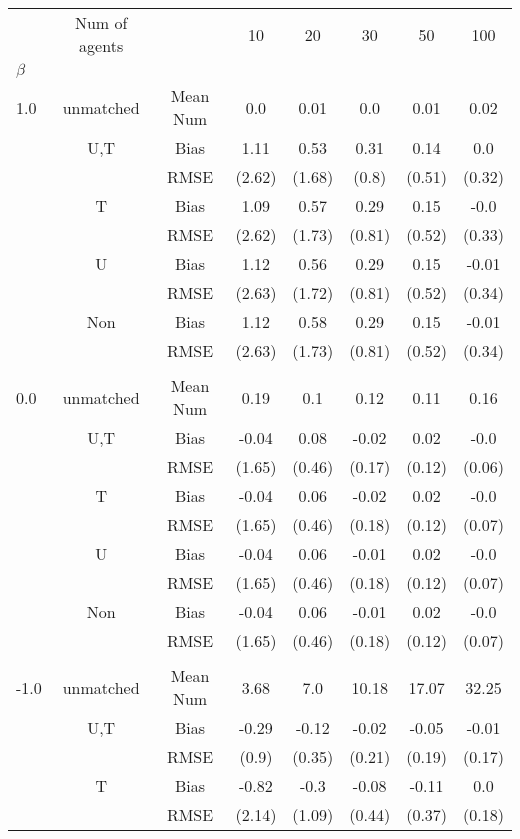 \begin{tabular}{@{\extracolsep{5pt}}lc|cccccc}
\toprule 
 & Num of agents &  & 10 & 20 & 30 & 50 & 100 \\
$\beta$ &  &  &  &  &  &  &  \\
\midrule 
1.0 & unmatched & Mean Num & 0.0 & 0.01 & 0.0 & 0.01 & 0.02 \\
 & U,T & Bias & 1.11 & 0.53 & 0.31 & 0.14 & 0.0 \\
 &  & RMSE & (2.62) & (1.68) & (0.8) & (0.51) & (0.32) \\
 & T & Bias & 1.09 & 0.57 & 0.29 & 0.15 & -0.0 \\
 &  & RMSE & (2.62) & (1.73) & (0.81) & (0.52) & (0.33) \\
 & U & Bias & 1.12 & 0.56 & 0.29 & 0.15 & -0.01 \\
 &  & RMSE & (2.63) & (1.72) & (0.81) & (0.52) & (0.34) \\
 & Non & Bias & 1.12 & 0.58 & 0.29 & 0.15 & -0.01 \\
 &  & RMSE & (2.63) & (1.73) & (0.81) & (0.52) & (0.34) \\
 &  &  &  &  &  &  &  \\
0.0 & unmatched & Mean Num & 0.19 & 0.1 & 0.12 & 0.11 & 0.16 \\
 & U,T & Bias & -0.04 & 0.08 & -0.02 & 0.02 & -0.0 \\
 &  & RMSE & (1.65) & (0.46) & (0.17) & (0.12) & (0.06) \\
 & T & Bias & -0.04 & 0.06 & -0.02 & 0.02 & -0.0 \\
 &  & RMSE & (1.65) & (0.46) & (0.18) & (0.12) & (0.07) \\
 & U & Bias & -0.04 & 0.06 & -0.01 & 0.02 & -0.0 \\
 &  & RMSE & (1.65) & (0.46) & (0.18) & (0.12) & (0.07) \\
 & Non & Bias & -0.04 & 0.06 & -0.01 & 0.02 & -0.0 \\
 &  & RMSE & (1.65) & (0.46) & (0.18) & (0.12) & (0.07) \\
 &  &  &  &  &  &  &  \\
-1.0 & unmatched & Mean Num & 3.68 & 7.0 & 10.18 & 17.07 & 32.25 \\
 & U,T & Bias & -0.29 & -0.12 & -0.02 & -0.05 & -0.01 \\
 &  & RMSE & (0.9) & (0.35) & (0.21) & (0.19) & (0.17) \\
 & T & Bias & -0.82 & -0.3 & -0.08 & -0.11 & 0.0 \\
 &  & RMSE & (2.14) & (1.09) & (0.44) & (0.37) & (0.18) \\

\end{tabular}
